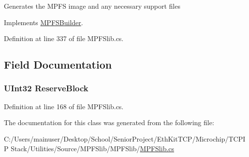 Generates the M\+P\+F\+S image and any necessary support files 



Implements \hyperlink{class_microchip_1_1_m_p_f_s_builder_a287235d1a30bc3bb959b1c3b38fb154a}{M\+P\+F\+S\+Builder}.



Definition at line 337 of file M\+P\+F\+Slib.\+cs.



\subsection{Field Documentation}
\hypertarget{class_microchip_1_1_m_p_f_s_classic_builder_acaab17b4edbb5ac622af4c56cccfb60b}{}
\subsubsection[{Reserve\+Block}]{\setlength{\rightskip}{0pt plus 5cm}U\+Int32 Reserve\+Block}\label{class_microchip_1_1_m_p_f_s_classic_builder_acaab17b4edbb5ac622af4c56cccfb60b}


Definition at line 168 of file M\+P\+F\+Slib.\+cs.



The documentation for this class was generated from the following file\+:\begin{DoxyCompactItemize}
\item 
C\+:/\+Users/mainuser/\+Desktop/\+School/\+Senior\+Project/\+Eth\+Kit\+T\+C\+P/\+Microchip/\+T\+C\+P\+I\+P Stack/\+Utilities/\+Source/\+M\+P\+F\+Slib/\+M\+P\+F\+Slib/\hyperlink{_m_p_f_slib_8cs}{M\+P\+F\+Slib.\+cs}\end{DoxyCompactItemize}
